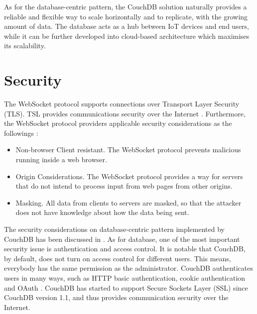 As for the database-centric pattern, the CouchDB solution naturally provides a reliable and flexible way to scale horizontally and to replicate, with the growing amount of data. The database acts as a hub between IoT devices and end users, while it can be further developed into cloud-based architecture which maximises its scalability. 

\section{Security}
The WebSocket protocol supports connections over Transport Layer Security (TLS). TSL provides communications security over the Internet \cite{dierks2008rfc}. Furthermore, the WebSocket protocol providers applicable security considerations as the followings \cite{rfc64552012web}: 

\begin{itemize}
\setlength{\itemsep}{0pt}
\item Non-browser Client resistant. The WebSocket protocol prevents malicious running inside a web browser. 
\item Origin Considerations. The WebSocket protocol provides a way for servers that do not intend to process input from web pages from other origins.
\item Masking. All data from clients to servers are masked, so that the attacker does not have knowledge about how the data being sent.
\end{itemize}

The security considerations on database-centric pattern implemented by CouchDB has been discussed in \cite{francesco2012storage}. As for database, one of the most important security issue is authentication and access control. It is notable that CouchDB, by default, does not turn on access control for different users. This means, everybody has the same permission as the administrator. CouchDB authenticates users in many ways, such as HTTP basic authentication, cookie authentication and OAuth \cite{hammer2010oauth}. CouchDB has started to support Secure Sockets Layer (SSL) since CouchDB version 1.1, and thus provides communication security over the Internet.